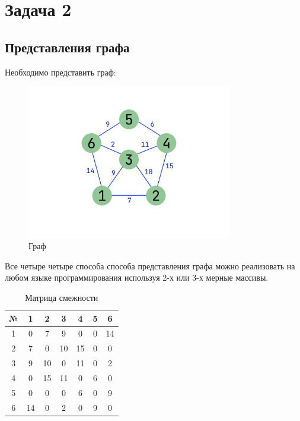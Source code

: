 \newpage
\section{Задача 2}

\subsection{Представления графа}

Необходимо представить граф:

\begin{figure}[H]
    \centering
    \includegraphics[width=0.8\textwidth]{./flowcharts/graph.png}
    \caption{Граф}
\end{figure}



Все четыре четыре способа способа представления 
графа можно реализовать на любом языке программирования 
используя 2-х или 3-х мерные массивы.


\begin{table}[!ht]
    \centering
    \caption{Матрица смежности}
    \begin{tabular}{|c|c|c|c|c|c|c|}
    \hline
        № & 1 & 2 & 3 & 4 & 5 & 6 \\ \hline
        1 & 0 & 7 & 9 & 0 & 0 & 14 \\ \hline
        2 & 7 & 0 & 10 & 15 & 0 & 0 \\ \hline
        3 & 9 & 10 & 0 & 11 & 0 & 2 \\ \hline
        4 & 0 & 15 & 11 & 0 & 6 & 0 \\ \hline
        5 & 0 & 0 & 0 & 6 & 0 & 9 \\ \hline
        6 & 14 & 0 & 2 & 0 & 9 & 0 \\ \hline
    \end{tabular}
    \label{Матрица смежности}
\end{table}



